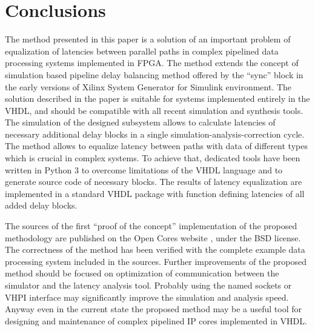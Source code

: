 \documentclass[preprint,11pt]{elsarticle}
\newcommand{\wzcite}[1]{ \cite{#1}}
\begin{document}
\section{Conclusions}
The method presented in this paper is a solution of an important problem of equalization of latencies between parallel paths in complex pipelined data processing systems implemented in FPGA.
The method extends the concept of simulation based pipeline delay balancing method offered by the
``sync'' block in the early versions of Xilinx System Generator for Simulink environment.
The solution described in the paper is suitable for systems implemented entirely in the VHDL,
and should be compatible with all recent simulation and synthesis tools.
The simulation of the designed subsystem allows to calculate latencies 
of necessary additional delay blocks in a single simulation-analysis-correction cycle.
The method allows to equalize latency between paths with data of different types
which is crucial in complex systems.
To achieve that, dedicated tools have been written in Python 3 to overcome limitations
of the VHDL language	and to generate source code of necessary blocks.
The results of latency equalization are implemented in a standard VHDL package with function defining latencies of all added delay blocks. 

The sources of the first ``proof of the concept'' implementation of the proposed methodology are published on the Open Cores website\wzcite{url-opencores-lateq}, under the BSD license.
The correctness of the method has been verified with the complete example data processing system included in the sources.
Further improvements of the proposed method should be focused on optimization of communication between the simulator and the latency analysis tool. Probably using the named sockets or VHPI interface may significantly improve the simulation and analysis speed.
Anyway even in the current state the proposed method may be a useful tool for designing
and maintenance of complex pipelined IP cores implemented in VHDL.
	
    


      
\end{document}
